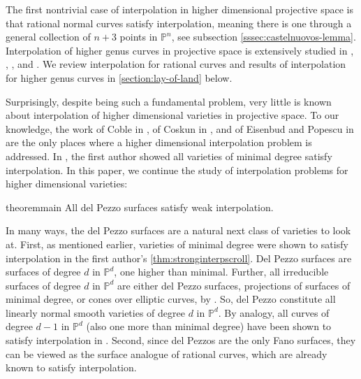 \documentclass[reqno, 11pt]{amsart}
\theoremstyle{definition}
\theoremstyle{remark}
\numberwithin{equation}{section}
\numberwithin{thm}{section}
\numberwithin{prop}{section}
\numberwithin{lem}{section}
\numberwithin{cor}{section}
\numberwithin{conj}{section}
\numberwithin{defn}{section}
\theoremstyle{plain}
\theoremstyle{definition}
\newcommand\bp{{\mathbb P}}
\begin{document}
The first nontrivial case of interpolation in higher dimensional projective space is that rational normal curves satisfy interpolation,
meaning there is one through a general collection of $n + 3$ points in $\bp^n$, see subsection \ref{sssec:castelnuovos-lemma}.
Interpolation of higher genus curves in projective space is extensively
studied in 
\cite{stevens:on-the-number-of-points-determining-a-canonical-curve}, \cite{atanasovLY:interpolation-for-normal-bundles-of-general-curves}, \cite{atanasovLY:interpolation-for-normal-bundles-of-general-curves}, and \cite{larson:interpolation-for-restricted-tangent-bundles-of-general-curves}. We review interpolation
for rational curves and results of interpolation for higher genus curves in \autoref{section:lay-of-land} below.






Surprisingly, despite being such a  fundamental problem,
very little is known about interpolation
of higher dimensional varieties in projective space.  To our knowledge, the work of Coble in \cite{coble:associated-sets-of-points}, of
Coskun in \cite{coskun:degenerations-of-surface-scrolls}, and of Eisenbud and Popescu in
\cite[Theorem 4.5]{eisenbudP:the-projective-geometry-of-the-gale-transform} 
are the only places where a higher dimensional interpolation problem is addressed. In \cite[Theorem 1.1]{landesman:interpolation-of-varieties-of-minimal-degree}, the first author showed all varieties of minimal degree satisfy
interpolation.  
In this paper, we continue the study of interpolation problems for higher dimensional
varieties:
\begin{restatable}{theorem}{main}
	\label{theorem:main}
All del Pezzo surfaces satisfy weak interpolation.
\end{restatable}

In many ways, the del Pezzo surfaces are a natural next
class of varieties to look at. First, as mentioned earlier, varieties of
minimal degree were shown to satisfy interpolation
in the first author's \autoref{thm:stronginterpscroll}. Del Pezzo surfaces
are surfaces of degree $d$ in $\bp^d$, one higher
than minimal. Further, all irreducible surfaces of
degree $d$ in $\bp^d$ are either del Pezzo surfaces,
projections of surfaces of minimal degree, or cones
over elliptic curves, by \cite[Theorem 2.5]{coskun:the-enumerative-geometry-of-del-Pezzo-surfaces-via-degenerations}. So, del Pezzo constitute all 
linearly normal smooth varieties of
degree $d$ in $\bp^d$.
By analogy, all curves of degree $d-1$ in $\bp^d$
(also one more than minimal degree) have been shown
to satisfy interpolation in \cite[Theorem 1.3]{atanasovLY:interpolation-for-normal-bundles-of-general-curves}.
Second, since del Pezzos are the only Fano surfaces, they can
be viewed as the surface analogue of rational curves, which are already
known to satisfy interpolation.
\end{document}
